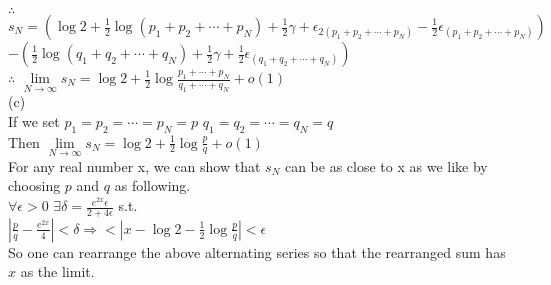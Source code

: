 \documentclass{article}
\begin{document}
$\therefore$ \qquad $\displaystyle s_N = \left(\log{2} + \frac{1}{2} \log{(p_1+p_2+\cdots+p_N)} + \frac{1}{2} \gamma + \epsilon_{2(p_1+p_2+\cdots+p_N)} - \frac{1}{2} \epsilon_{(p_1+p_2+\cdots+p_N)}\right)$\\

\hskip 1.57cm $\displaystyle - \left(\frac{1}{2} \log{(q_1+q_2+\cdots+q_N)} + \frac{1}{2} \gamma + \frac{1}{2}\epsilon_{(q_1+q_2+\cdots+q_N)}\right)$\\

$\therefore$ \qquad $\displaystyle \lim \limits_{N \to \infty} s_N = \log{2} + \frac{1}{2} \log{\frac{p_1+\cdots+p_N}{q_1+\cdots+q_N}} + o(1)$\\

(c)\\

If we set $p_1 = p_2 = \cdots = p_N = p$ \quad $q_1 = q_2 = \cdots = q_N = q$\\

Then $\displaystyle \lim \limits_{N \to \infty}s_N = \log{2} + \frac{1}{2} \log{\frac{p}{q}} + o(1)$\\

For any real number x, we can show that $s_N$ can be as close to x as we like by choosing $p$ and $q$ as following.\\

$\forall \epsilon>0$ \quad $\displaystyle \exists \delta = \frac{e^{2x} \epsilon}{2+4\epsilon}$ \quad s.t.\\

$\displaystyle |\frac{p}{q} - \frac{e^{2x}}{4}| < \delta \Rightarrow  < \left|x - \log{2} - \frac{1}{2} \log{\frac{p}{q}}\right| < \epsilon$\\

So one can rearrange the above alternating series so that the rearranged sum has $x$ as the limit.\\

\vskip 3cm
\end{document}
